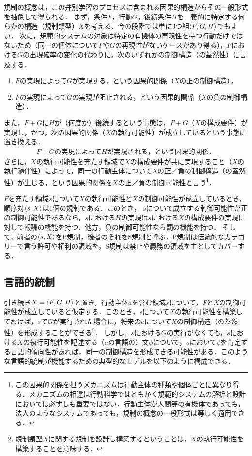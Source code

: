 規制の概念は，この弁別学習のプロセスに含まれる因果的構造からその一般形式を抽象して得られる．
まず，条件$F$，行動$G$，後続条件$H$を一義的に特定する何らかの構造（規制類型）$X$を考える．今の段階では単に3つ組$\langle F,G,H \rangle$でもよい．
次に，規範的システムの対象は特定の有機体の再現性を持つ行動だけではないため（同一の個体について$F$や$G$の再現性がないケースがあり得る），$F$における$G$の出現確率の変化の代わりに，次のいずれかの制御構造（の蓋然性）に言及する．
\begin{enumerate}[label=(\arabic*)]
    \item $F$の実現によって$G$が実現する，という因果的関係（$X$の正の制御構造），
    \item $F$の実現によって$G$の実現が阻止される，という因果的関係（$X$の負の制御構造）．
\end{enumerate}
また，$F+G$に$H$が（何度か）後続するという事態は，$F+G$（$X$の構成要件）が実現し，かつ，次の因果的関係（$X$の執行可能性）が成立しているという事態に置き換える．
\begin{align*}
    \text{$F+G$の実現によって$H$が実現される，という因果的関係．}
\end{align*}
さらに，$X$の執行可能性を充たす領域で$X$の構成要件が共に実現すること（$X$の執行随伴性）によって，同一の行動主体について$X$の正／負の制御構造（の蓋然性）が生じる，という因果的関係を$X$の正／負の制御可能性と言う\footnote{この因果的関係を担うメカニズムは行動主体の種類や個体ごとに異なり得る．メカニズムの相違は行動科学ではともかく規範的システムの解析と設計においては必ずしも重要ではない．行動主体が人間等の有機体であっても，法人のようなシステムであっても，規制の概念の一般形式は等しく適用できる．}．

$F$を充たす領域$s$について$X$の執行可能性と$X$の制御可能性が成立しているとき，順序対$\langle s,X \rangle$は1個の規制である．このとき，
$s$について成立する制御可能性が正の制御可能性であるなら，$s$における$H$の実現は$s$における$X$の構成要件の実現に対して報酬の機能を持つ．他方，負の制御可能性なら罰の機能を持つ．
そして，前者の$\langle s,X \rangle$をP規制，後者のそれをS規制と呼ぶ．P規制は伝統的なカテゴリーで言う許可や権利の領域を，S規制は禁止や義務の領域を主としてカバーする．

\subsection{言語的統制}

引き続き$X=\langle F,G,H \rangle$と置き，行動主体$a$を含む領域$s$について，$F$と$X$の制御可能性が成立していると仮定する．このとき，$s$について$X$の執行可能性を構築しておけば，$s$で$G$が実行された場合に，将来の$a$について$X$の制御構造（の蓋然性）を形成することができる\footnote{規制類型$X$に関する規制を設計し構築するということは，$X$の執行可能性を構築することを意味する．}．
しかし，$s$における$G$の実行がなくても，$s$における$X$の執行可能性を記述する（$a$の言語の）文$\phi$について，$a$において$\phi$を肯定する言語的傾向性があれば，同一の制御構造を形成できる可能性がある．このような言語的統制が機能するための典型的なモデルを以下のように構成できる．

